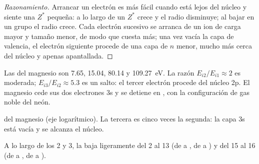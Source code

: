 \begin{proof}[Razonamiento]
Arrancar un electrón es más fácil cuando está lejos del núcleo y siente
una $Z^{*}$ pequeña: a lo largo de un  $Z^{*}$ crece y el radio
disminuye; al bajar en un grupo el radio crece. Cada electrón sucesivo se
arranca de un ion de carga mayor y tamaño menor, de modo que cuesta más;
una vez vacía la capa de valencia, el electrón siguiente procede de una
capa de $n$ menor, mucho más cerca del núcleo y apenas apantallada.
\end{proof}

\begin{example}[El magnesio]\label{ex:b1:periodicity:magnesium}
Las  del magnesio son 7.65, 15.04, 80.14
y \qty{109.27}{eV}. La razón $E_{i2}/E_{i1} \approx 2$ es moderada;
$E_{i3}/E_{i2} \approx 5.3$ es un salto: el tercer electrón procede del
núcleo 2p. El magnesio cede sus dos electrones 3s y se detiene en
, con la configuración de gas noble del neón.
\end{example}

\begin{omfigure}

{\small {} del magnesio (eje logarítmico).
La tercera es cinco veces la segunda: la capa 3s está vacía y se alcanza
el núcleo.}
\end{omfigure}

\begin{proposition}\label{prop:b1:periodicity:ie-anomalies}
A lo largo de los  2 y 3, la  baja
ligeramente del  2 al  13 (de  a , de  a
) y del  15 al  16 (de  a , de  a
).
\end{proposition}

